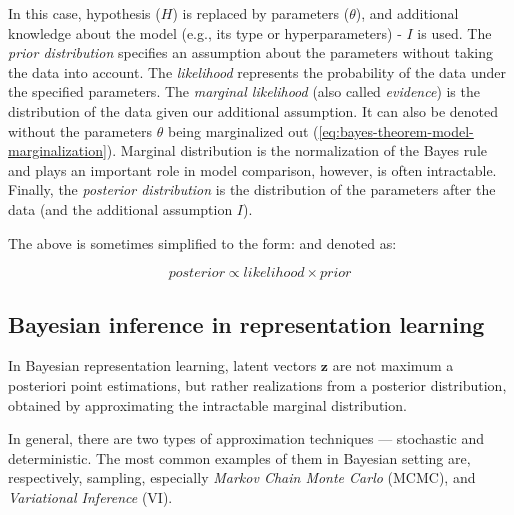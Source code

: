 \noindent In this case, hypothesis ($H$) is replaced by parameters ($\theta$), and additional knowledge about the model (e.g., its type or hyperparameters) - $I$ is used. The \textit{prior distribution} specifies an assumption about the parameters without taking the data into account. The \textit{likelihood} represents the probability of the data under the specified parameters. The \textit{marginal likelihood} (also called \textit{evidence}) is the distribution of the data given our additional assumption. It can also be denoted without the parameters $\theta$ being marginalized out (\autoref{eq:bayes-theorem-model-marginalization}). Marginal distribution is the normalization of the Bayes rule and plays an important role in model comparison, however, is often intractable. Finally, the \textit{posterior distribution} is the distribution of the parameters after  the data (and the additional assumption $I$). 

\vspace{\baselineskip}
The above is sometimes simplified to the form:  and denoted as:

\begin{equation}
    posterior \propto likelihood \times prior
\end{equation}

\subsection{Bayesian inference in representation learning}\label{subsec:bayesian-inference}
In Bayesian representation learning, latent vectors $\mathbf{z}$ are not maximum a posteriori point estimations, but rather realizations from a posterior distribution, obtained by approximating the intractable marginal distribution.


In general, there are two types of approximation techniques — stochastic and deterministic. The most common examples of them in Bayesian setting are, respectively, sampling, especially \textit{Markov Chain Monte Carlo} (MCMC), and \textit{Variational Inference} (VI).


